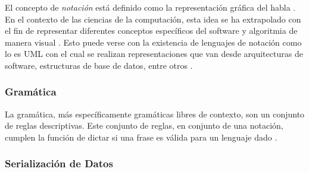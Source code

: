 \documentclass[12pt]{article}
\begin{document}



    El concepto de \textit{notación} está definido como la representación gráfica del habla \cite{crystal2011dictionary}. En el contexto de las ciencias de la computación, esta idea se ha extrapolado con el fin de representar diferentes conceptos específicos del software y algoritmia de manera visual \cite{RutanenKalle2018McoO}. Esto puede verse con la existencia de lenguajes de notación como lo es UML con el cual se realizan representaciones que van desde arquitecturas de software, estructuras de base de datos, entre otros \cite{Booch2005-xu}.
    
    \subsubsection{Gramática}


    La gramática, más específicamente gramáticas libres de contexto, son un conjunto de reglas descriptivas. Este conjunto de reglas, en conjunto de una notación, cumplen la función de dictar si una frase es válida para un lenguaje dado \cite[p. 101]{Sipser2012-wl}. 

    \subsubsection{Serialización de Datos}

\end{document}
